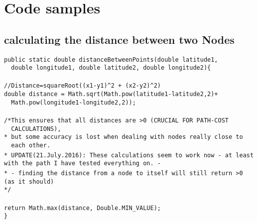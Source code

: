 \chapter{Code samples}
\section{calculating the distance between two Nodes}
\verb|public static double distanceBetweenPoints(double latitude1,|\\  \verb|  double longitude1, double latitude2, double longitude2){|\\
\\
\verb|//Distance=squareRoot((x1-y1)^2 + (x2-y2)^2)|\\
\verb|double distance = Math.sqrt(Math.pow(latitude1-latitude2,2)+|\\
  \verb|  Math.pow(longitude1-longitude2,2));|\\
\\
\verb|/*This ensures that all distances are >0 (CRUCIAL FOR PATH-COST|\\
  \verb|  CALCULATIONS),|\\
\verb|* but some accuracy is lost when dealing with nodes really close to|\\
  \verb|  each other.|\\
\verb|* UPDATE(21.July.2016): These calculations seem to work now - at least|
  \verb|  with the path I have tested everything on. -|\\
\verb|* - finding the distance from a node to itself will still return >0|
  \verb|  (as it should)|\\
\verb|*/|\\
\\
\verb|return Math.max(distance, Double.MIN_VALUE);|\\
\verb|}|\\

\newpage
